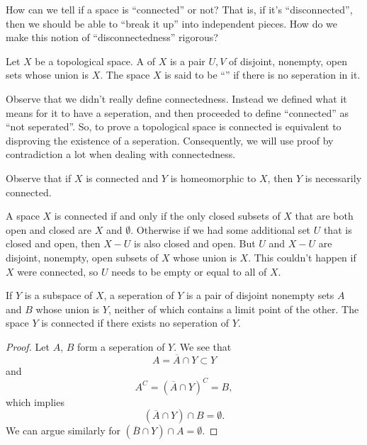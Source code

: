 \begin{prob}
How can we tell if a space is ``connected'' or not? That is, if
it's ``disconnected'', then we should be able to ``break it up''
into independent pieces. How do we make this notion of
``disconnectedness'' rigorous?
\end{prob}
\begin{defn}\label{defn:seperation}
Let $X$ be a topological space. A  of $X$ is a
pair $U,V$ of disjoint, nonempty, open sets whose union is
$X$. The space $X$ is said to be ``'' if there
is no seperation in it.
\end{defn}
\begin{rmk}
Observe that we didn't really define connectedness. Instead we
defined what it means for it to have a seperation, and then
proceeded to define ``connected'' as ``not seperated''. So, to
prove a topological space is connected is equivalent to
disproving the existence of a seperation. Consequently, we will
use proof by contradiction a lot when dealing with connectedness.
\end{rmk}
\begin{rmk}
Observe that if $X$ is connected and $Y$ is homeomorphic to $X$,
then $Y$ is necessarily connected.
\end{rmk}
\begin{rmk}
A space $X$ is connected if and only if the only closed subsets
of $X$ that are both open and closed are $X$ and
$\emptyset$. Otherwise if we had some additional set $U$ that is
closed and open, then $X-U$ is also closed and open. But $U$ and
$X-U$ are disjoint, nonempty, open subsets of $X$ whose union is
$X$. This couldn't happen if $X$ were connected, so $U$ needs to
be empty or equal to all of $X$.
\end{rmk}
\begin{lem}\label{lemma:subspaceConnectedness}
If $Y$ is a subspace of $X$, a seperation of $Y$ is a pair of
disjoint nonempty sets $A$ and $B$ whose union is $Y$, neither of
which contains a limit point of the other. The space $Y$ is
connected if there exists no seperation of $Y$.
\end{lem}
\begin{proof}
Let $A$, $B$ form a seperation of $Y$. We see that
\begin{equation}%
A=\overline{A}\cap Y\subset Y
\end{equation}
and
\begin{equation}%
A^{C}=(\overline{A}\cap Y)^{C}=B,
\end{equation}
which implies
\begin{equation}%
(\overline{A}\cap Y)\cap B=\emptyset.
\end{equation}
We can argue similarly for $(\overline{B}\cap Y)\cap A=\emptyset$.
\end{proof}
